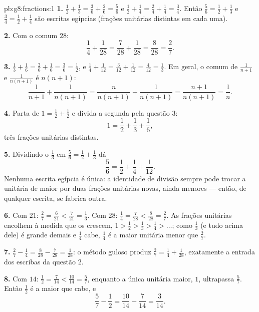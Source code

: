 \begin{solution}{pb:g8:fractions:1}
\textbf{1.} $\frac12 + \frac13 = \frac36 + \frac26 = \frac56$ e
$\frac12 + \frac14 = \frac24 + \frac14 = \frac34$. Então
$\frac56 = \frac12 + \frac13$ e $\frac34 = \frac12 + \frac14$ são
escritas egípcias (frações unitárias distintas em cada uma).

\textbf{2.} Com o  comum $28$:
\[
\frac14 + \frac{1}{28} = \frac{7}{28} + \frac{1}{28}
= \frac{8}{28} = \frac{2}{7} .
\]

\textbf{3.} $\frac13 + \frac16 = \frac26 + \frac16 = \frac36 =
\frac12$, e $\frac14 + \frac{1}{12} = \frac{3}{12} + \frac{1}{12} =
\frac{4}{12} = \frac13$. Em geral, o  comum de
$\frac{1}{n+1}$ e $\frac{1}{n(n+1)}$ é $n(n+1)$:
\[
\frac{1}{n+1} + \frac{1}{n(n+1)}
= \frac{n}{n(n+1)} + \frac{1}{n(n+1)}
= \frac{n+1}{n(n+1)}
= \frac{1}{n} .
\]

\textbf{4.} Parta de $1 = \frac12 + \frac12$ e divida a segunda 
pela questão 3:
\[
1 = \frac12 + \frac13 + \frac16 ,
\]
três frações unitárias distintas.

\textbf{5.} Dividindo o $\frac13$ em $\frac56 = \frac12 + \frac13$ dá
\[
\frac56 = \frac12 + \frac14 + \frac{1}{12} .
\]
Nenhuma escrita egípcia é única: a identidade de divisão sempre pode
trocar a  unitária de maior  por duas frações
unitárias novas, ainda menores --- então, de qualquer escrita, se
fabrica outra.

\textbf{6.} Com  $21$: $\frac27 = \frac{6}{21} <
\frac{7}{21} = \frac13$. Com  $28$: $\frac14 =
\frac{7}{28} < \frac{8}{28} = \frac27$. As frações unitárias encolhem à
medida que os  crescem,
$1 > \frac12 > \frac13 > \frac14 > \dots$; como $\frac13$ (e tudo
acima dele) é grande demais e $\frac14$ cabe, $\frac14$ é a maior
 unitária menor que $\frac27$.

\textbf{7.} $\frac27 - \frac14 = \frac{8}{28} - \frac{7}{28} =
\frac{1}{28}$: o método guloso produz
$\frac27 = \frac14 + \frac{1}{28}$, exatamente a entrada dos escribas
da questão 2.

\textbf{8.} Com  $14$: $\frac12 = \frac{7}{14} <
\frac{10}{14} = \frac57$, enquanto a única  unitária maior, $1$,
ultrapassa $\frac57$. Então $\frac12$ é a maior que cabe, e
\[
\frac57 - \frac12 = \frac{10}{14} - \frac{7}{14} = \frac{3}{14} .
\]


\end{solution}
